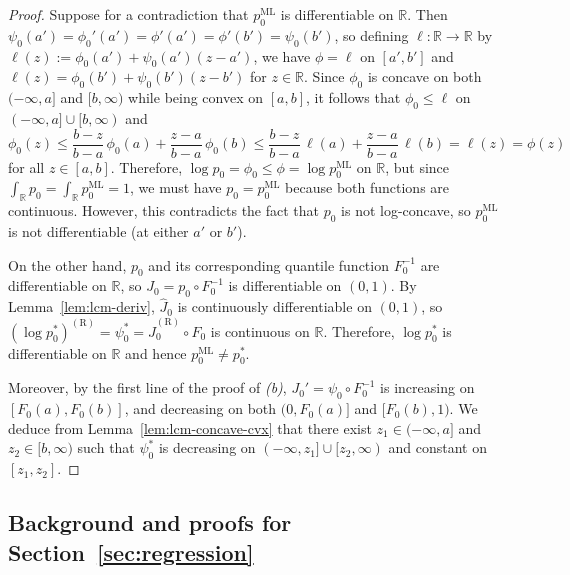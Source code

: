 \documentclass[a4paper]{article}
\newcommand{\R}{\mathbb{R}}
\theoremstyle{definition}
\begin{document}
\begin{proof}
Suppose for a contradiction that $p_0^{\mathrm{ML}}$ is differentiable on $\R$. Then $\psi_0(a') = \phi_0'(a') = \phi'(a') = \phi'(b') = \psi_0(b')$, so defining $\ell \colon \R \to \R$ by $\ell(z) := \phi_0(a') + \psi_0(a')(z - a')$, we have $\phi = \ell$ on $[a',b']$ and $\ell(z) = \phi_0(b') + \psi_0(b')(z - b')$ for $z \in \R$. Since $\phi_0$ is concave on both $(-\infty,a]$ and $[b,\infty)$ while being convex on $[a,b]$, it follows that $\phi_0 \leq \ell$ on $(-\infty,a] \cup [b,\infty)$ and
\[
\phi_0(z) \leq \frac{b - z}{b - a}\,\phi_0(a) + \frac{z - a}{b - a}\,\phi_0(b) \leq \frac{b - z}{b - a}\,\ell(a) + \frac{z - a}{b - a}\,\ell(b) = \ell(z) = \phi(z)
\]
for all $z \in [a,b]$. Therefore, $\log p_0 = \phi_0 \leq \phi = \log p_0^{\mathrm{ML}}$ on $\R$, but since $\int_\R p_0 = \int_\R p_0^{\mathrm{ML}} = 1$, we must have $p_0 = p_0^{\mathrm{ML}}$ because both functions are continuous. However, this contradicts the fact that $p_0$ is not log-concave, so $p_0^{\mathrm{ML}}$ is not differentiable (at either $a'$ or $b'$).

On the other hand, $p_0$ and its corresponding quantile function $F_0^{-1}$ are differentiable on $\R$, so $J_0 = p_0 \circ F_0^{-1}$ is differentiable on $(0,1)$. By Lemma~\ref{lem:lcm-deriv}, $\hat{J}_0$ is continuously differentiable on $(0,1)$, so $(\log p_0^*)^{(\mathrm{R})} = \psi_0^* = \hat{J}_0^{(\mathrm{R})} \circ F_0$ is continuous on $\R$. Therefore, $\log p_0^*$ is differentiable on $\R$ and hence $p_0^{\mathrm{ML}} \neq p_0^*$.

Moreover, by the first line of the proof of \textit{(b)}, $J_0' = \psi_0 \circ F_0^{-1}$ is increasing on $[F_0(a),F_0(b)]$, and decreasing on both $(0,F_0(a)]$ and $[F_0(b),1)$. We deduce from Lemma~\ref{lem:lcm-concave-cvx} that there exist $z_1 \in (-\infty,a]$ and $z_2 \in [b,\infty)$ such that $\psi_0^*$ is decreasing on $(-\infty,z_1] \cup [z_2,\infty)$ and constant on $[z_1,z_2]$.
\end{proof}

\subsection{Background and proofs for Section~\ref{sec:regression}}
\label{subsec:regression-proofs}
\end{document}
